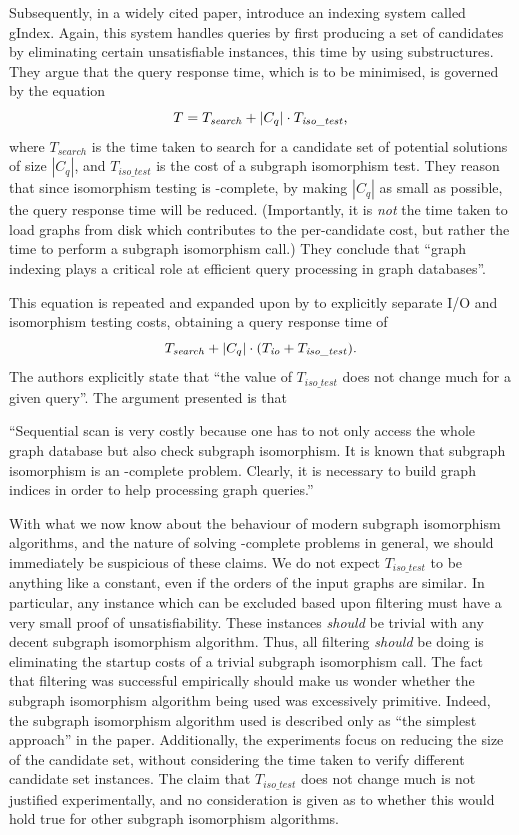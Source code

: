 \documentclass[twoside,11pt]{article}
\newcommand{\citet}[1]{\citeA{#1}}
\begin{document}
Subsequently, in a widely cited paper, \citet{DBLP:conf/sigmod/YanYH04} introduce an indexing system
called gIndex. Again, this system handles queries by first producing a set of candidates by
eliminating certain unsatisfiable instances, this time by using substructures. They argue that the
query response time, which is to be minimised, is governed by the equation \[ T =
T_{\mathit{search}} + \left|C_q\right| \cdot T_{\mathit{iso\_test}} \textnormal{,}\] where
$T_{\mathit{search}}$ is the time taken to search for a candidate set of potential solutions of size
$\left|C_q\right|$, and $T_{\mathit{iso\_test}}$ is the cost of a subgraph isomorphism test. They
reason that since isomorphism testing is \NP-complete, by making $\left|C_q\right|$ as small as
possible, the query response time will be reduced.  (Importantly, it is \emph{not} the time taken to
load graphs from disk which contributes to the per-candidate cost, but rather the time to perform a
subgraph isomorphism call.) They conclude that ``graph indexing plays a critical role at efficient
query processing in graph databases''.

This equation is repeated and expanded upon by \citet{DBLP:journals/tods/YanYH05} to explicitly
separate I/O and isomorphism testing costs, obtaining a query response time of \[
    T_{\mathit{search}} + \left|C_q\right| \cdot (T_{\mathit{io}} + T_{\mathit{iso\_test}})
    \textnormal{.} \] The authors explicitly state that ``the value of $T_{\mathit{iso\_test}}$ does
not change much for a given query''. The argument presented is that
\begin{displayquote}``Sequential scan is very costly
because one has to not only access the whole graph database but also check subgraph isomorphism. It
is known that subgraph isomorphism is an \NP-complete problem. Clearly, it is necessary to build
graph indices in order to help processing graph queries.''\end{displayquote}
With what we now know about the behaviour of modern subgraph isomorphism algorithms, and the nature
of solving \NP-complete problems in general, we should immediately be suspicious of these claims. We
do not expect $T_{\mathit{iso\_test}}$ to be anything like a constant, even if the orders of the
input graphs are similar. In particular, any instance which can be excluded based upon filtering
must have a very small proof of unsatisfiability. These instances \emph{should} be trivial with any
decent subgraph isomorphism algorithm. Thus, all filtering \emph{should} be doing is eliminating the startup
costs of a trivial subgraph isomorphism call. The fact that filtering was successful empirically
should make us wonder whether the subgraph isomorphism algorithm being used was excessively
primitive. Indeed, the subgraph isomorphism algorithm used is described only as ``the simplest approach'' in the
paper.  Additionally, the experiments focus on reducing the size of the candidate set, without
considering the time taken to verify different candidate set instances.  The claim that
$T_{\mathit{iso\_test}}$ does not change much is not justified experimentally, and no consideration
is given as to whether this would hold true for other subgraph isomorphism algorithms.
\end{document}
